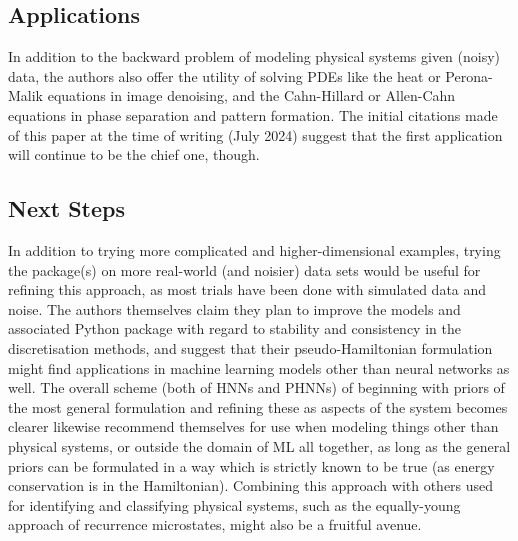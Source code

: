 \documentclass[10 pt, a4paper]{article}
\begin{document}
\begin{comment}
The upshot seems to be that given certain conditions and preexisting knowledge, the HNN approach and its PHNN refinement seem to offer a tantalising possibility for analysing unknown phenomena and extracting their dynamics, or establishing which rules a system measured with very noisy data might be following. However the approach does need further refining before such possibilities are likely to be realised, and the true test would be to actually use it to identify systems (double-)blinded.
\end{comment}
\subsection{Applications}
In addition to the backward problem of modeling physical systems given (noisy) data, the authors also offer the utility of solving PDEs like the heat or Perona-Malik equations in image denoising, and the Cahn-Hillard or Allen-Cahn equations in phase separation and pattern formation. The initial citations made of this paper at the time of writing (July 2024) suggest that the first application will continue to be the chief one, though.
\subsection{Next Steps}
In addition to trying more complicated and higher-dimensional examples, trying the package(s) on more real-world (and noisier) data sets would be useful for refining this approach, as most trials have been done with simulated data and noise. The authors themselves claim they plan to improve the models and associated Python package with regard to stability and consistency in the discretisation methods, and suggest that their pseudo-Hamiltonian formulation might find applications in machine learning models other than neural networks as well. The overall scheme (both of HNNs and PHNNs) of beginning with priors of the most general formulation and refining these as aspects of the system becomes clearer likewise recommend themselves for use when modeling things other than physical systems, or outside the domain of ML all together, as long as the general priors can be formulated in a way which is strictly known to be true (as energy conservation is in the Hamiltonian). Combining this approach with others used for identifying and classifying physical systems, such as the equally-young approach of recurrence microstates, might also be a fruitful avenue.


\end{document}
